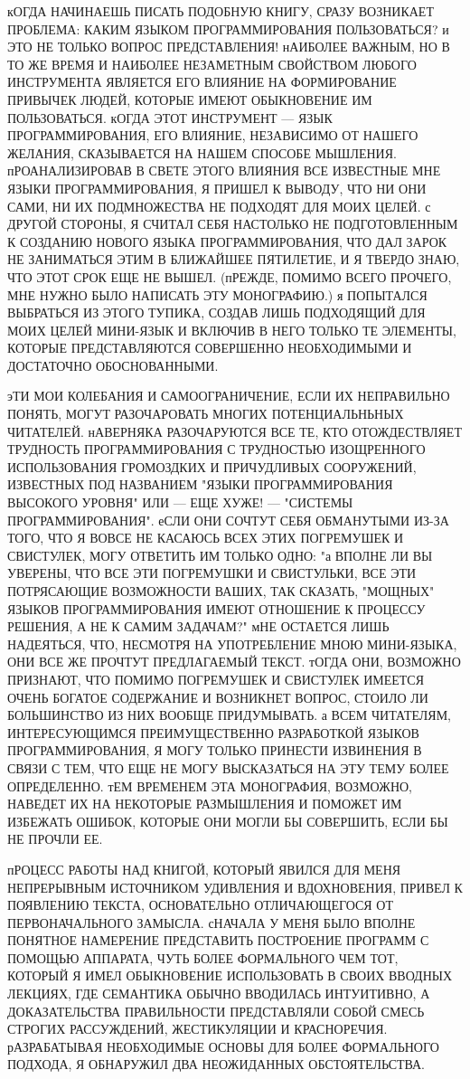 кОГДА НАЧИНАЕШЬ ПИСАТЬ ПОДОБНУЮ КНИГУ, СРАЗУ ВОЗНИКАЕТ ПРОБЛЕМА: КАКИМ 
ЯЗЫКОМ ПРОГРАММИРОВАНИЯ ПОЛЬЗОВАТЬСЯ? и ЭТО НЕ ТОЛЬКО ВОПРОС ПРЕДСТАВЛЕНИЯ!
нАИБОЛЕЕ ВАЖНЫМ, НО В ТО ЖЕ ВРЕМЯ И НАИБОЛЕЕ НЕЗАМЕТНЫМ СВОЙСТВОМ ЛЮБОГО 
ИНСТРУМЕНТА ЯВЛЯЕТСЯ ЕГО ВЛИЯНИЕ НА ФОРМИРОВАНИЕ ПРИВЫЧЕК ЛЮДЕЙ, КОТОРЫЕ 
ИМЕЮТ ОБЫКНОВЕНИЕ ИМ ПОЛЬЗОВАТЬСЯ. кОГДА ЭТОТ ИНСТРУМЕНТ --- ЯЗЫК 
ПРОГРАММИРОВАНИЯ, ЕГО ВЛИЯНИЕ, НЕЗАВИСИМО ОТ НАШЕГО ЖЕЛАНИЯ, СКАЗЫВАЕТСЯ
НА НАШЕМ СПОСОБЕ  МЫШЛЕНИЯ. пРОАНАЛИЗИРОВАВ В СВЕТЕ ЭТОГО ВЛИЯНИЯ ВСЕ 
ИЗВЕСТНЫЕ МНЕ ЯЗЫКИ ПРОГРАММИРОВАНИЯ, Я ПРИШЕЛ К ВЫВОДУ, ЧТО НИ ОНИ
САМИ, НИ ИХ ПОДМНОЖЕСТВА НЕ ПОДХОДЯТ ДЛЯ МОИХ ЦЕЛЕЙ. с ДРУГОЙ СТОРОНЫ, 
Я СЧИТАЛ СЕБЯ НАСТОЛЬКО НЕ ПОДГОТОВЛЕННЫМ К СОЗДАНИЮ НОВОГО ЯЗЫКА
ПРОГРАММИРОВАНИЯ, ЧТО ДАЛ ЗАРОК НЕ ЗАНИМАТЬСЯ ЭТИМ В БЛИЖАЙШЕЕ ПЯТИЛЕТИЕ, 
И Я ТВЕРДО ЗНАЮ, ЧТО ЭТОТ СРОК ЕЩЕ НЕ ВЫШЕЛ. (пРЕЖДЕ, ПОМИМО ВСЕГО ПРОЧЕГО,
МНЕ НУЖНО БЫЛО НАПИСАТЬ ЭТУ МОНОГРАФИЮ.) я ПОПЫТАЛСЯ ВЫБРАТЬСЯ ИЗ ЭТОГО 
ТУПИКА, СОЗДАВ ЛИШЬ ПОДХОДЯЩИЙ ДЛЯ МОИХ ЦЕЛЕЙ МИНИ-ЯЗЫК И ВКЛЮЧИВ В
НЕГО ТОЛЬКО ТЕ ЭЛЕМЕНТЫ, КОТОРЫЕ ПРЕДСТАВЛЯЮТСЯ СОВЕРШЕННО НЕОБХОДИМЫМИ 
И ДОСТАТОЧНО ОБОСНОВАННЫМИ.
     
эТИ МОИ КОЛЕБАНИЯ И САМООГРАНИЧЕНИЕ, ЕСЛИ ИХ НЕПРАВИЛЬНО ПОНЯТЬ, МОГУТ 
РАЗОЧАРОВАТЬ МНОГИХ ПОТЕНЦИАЛЬНЬНЫХ ЧИТАТЕЛЕЙ. нАВЕРНЯКА РАЗОЧАРУЮТСЯ
ВСЕ ТЕ, КТО ОТОЖДЕСТВЛЯЕТ ТРУДНОСТЬ ПРОГРАММИРОВАНИЯ С ТРУДНОСТЬЮ 
ИЗОЩРЕННОГО ИСПОЛЬЗОВАНИЯ ГРОМОЗДКИХ И ПРИЧУДЛИВЫХ СООРУЖЕНИЙ,
ИЗВЕСТНЫХ ПОД НАЗВАНИЕМ "ЯЗЫКИ ПРОГРАММИРОВАНИЯ ВЫСОКОГО УРОВНЯ" 
ИЛИ --- ЕЩЕ ХУЖЕ! --- "СИСТЕМЫ ПРОГРАММИРОВАНИЯ". еСЛИ ОНИ СОЧТУТ СЕБЯ 
ОБМАНУТЫМИ ИЗ-ЗА ТОГО, ЧТО Я ВОВСЕ НЕ КАСАЮСЬ ВСЕХ ЭТИХ ПОГРЕМУШЕК И 
СВИСТУЛЕК, МОГУ ОТВЕТИТЬ ИМ ТОЛЬКО ОДНО: "а ВПОЛНЕ ЛИ ВЫ УВЕРЕНЫ, ЧТО ВСЕ ЭТИ
ПОГРЕМУШКИ И СВИСТУЛЬКИ,  ВСЕ ЭТИ ПОТРЯСАЮЩИЕ ВОЗМОЖНОСТИ ВАШИХ, ТАК СКАЗАТЬ, 
"МОЩНЫХ" ЯЗЫКОВ ПРОГРАММИРОВАНИЯ ИМЕЮТ ОТНОШЕНИЕ К ПРОЦЕССУ РЕШЕНИЯ, А НЕ К 
САМИМ ЗАДАЧАМ?" мНЕ ОСТАЕТСЯ ЛИШЬ НАДЕЯТЬСЯ, ЧТО, НЕСМОТРЯ НА УПОТРЕБЛЕНИЕ 
МНОЮ МИНИ-ЯЗЫКА, ОНИ ВСЕ ЖЕ ПРОЧТУТ ПРЕДЛАГАЕМЫЙ ТЕКСТ. тОГДА ОНИ, ВОЗМОЖНО 
ПРИЗНАЮТ, ЧТО ПОМИМО ПОГРЕМУШЕК И СВИСТУЛЕК ИМЕЕТСЯ ОЧЕНЬ БОГАТОЕ СОДЕРЖАНИЕ 
И ВОЗНИКНЕТ ВОПРОС, СТОИЛО ЛИ БОЛЬШИНСТВО ИЗ НИХ ВООБЩЕ ПРИДУМЫВАТЬ. а ВСЕМ 
ЧИТАТЕЛЯМ, ИНТЕРЕСУЮЩИМСЯ ПРЕИМУЩЕСТВЕННО РАЗРАБОТКОЙ ЯЗЫКОВ ПРОГРАММИРОВАНИЯ, 
Я МОГУ ТОЛЬКО ПРИНЕСТИ ИЗВИНЕНИЯ В СВЯЗИ С ТЕМ, ЧТО ЕЩЕ НЕ МОГУ ВЫСКАЗАТЬСЯ НА 
ЭТУ ТЕМУ БОЛЕЕ ОПРЕДЕЛЕННО. тЕМ ВРЕМЕНЕМ ЭТА МОНОГРАФИЯ, ВОЗМОЖНО, НАВЕДЕТ ИХ 
НА НЕКОТОРЫЕ РАЗМЫШЛЕНИЯ И ПОМОЖЕТ ИМ ИЗБЕЖАТЬ ОШИБОК, КОТОРЫЕ ОНИ МОГЛИ БЫ 
СОВЕРШИТЬ, ЕСЛИ БЫ НЕ ПРОЧЛИ ЕЕ.

\bigskip
пРОЦЕСС РАБОТЫ НАД КНИГОЙ, КОТОРЫЙ ЯВИЛСЯ ДЛЯ  МЕНЯ НЕПРЕРЫВНЫМ ИСТОЧНИКОМ 
УДИВЛЕНИЯ И ВДОХНОВЕНИЯ, ПРИВЕЛ К ПОЯВЛЕНИЮ ТЕКСТА, ОСНОВАТЕЛЬНО ОТЛИЧАЮЩЕГОСЯ 
ОТ ПЕРВОНАЧАЛЬНОГО ЗАМЫСЛА. сНАЧАЛА У МЕНЯ БЫЛО ВПОЛНЕ ПОНЯТНОЕ НАМЕРЕНИЕ 
ПРЕДСТАВИТЬ ПОСТРОЕНИЕ ПРОГРАММ С ПОМОЩЬЮ  АППАРАТА, ЧУТЬ БОЛЕЕ ФОРМАЛЬНОГО 
ЧЕМ ТОТ, КОТОРЫЙ Я ИМЕЛ  ОБЫКНОВЕНИЕ ИСПОЛЬЗОВАТЬ В СВОИХ ВВОДНЫХ ЛЕКЦИЯХ, 
ГДЕ СЕМАНТИКА ОБЫЧНО ВВОДИЛАСЬ ИНТУИТИВНО, А ДОКАЗАТЕЛЬСТВА ПРАВИЛЬНОСТИ 
ПРЕДСТАВЛЯЛИ СОБОЙ СМЕСЬ СТРОГИХ РАССУЖДЕНИЙ, ЖЕСТИКУЛЯЦИИ И КРАСНОРЕЧИЯ.
рАЗРАБАТЫВАЯ НЕОБХОДИМЫЕ ОСНОВЫ ДЛЯ  БОЛЕЕ ФОРМАЛЬНОГО ПОДХОДА, Я ОБНАРУЖИЛ 
ДВА НЕОЖИДАННЫХ ОБСТОЯТЕЛЬСТВА.
     
